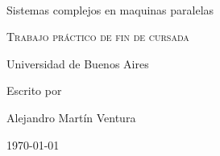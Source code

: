 \documentclass[9pt, a4paper,english,spanish]{amsart}
\begin{document}
\makeatletter
\preto{\@verbatim}{\topsep=0pt \partopsep=0pt }
\makeatother

\begin{center}
~\\ ~\\ ~\\ ~\\ ~\\ ~\\ 
{\LARGE Sistemas complejos en maquinas paralelas}%
\vspace*{1\baselineskip}

\scshape %
Trabajo práctico de fin de cursada

\vspace*{1\baselineskip}
Universidad de Buenos Aires\\[\baselineskip]


\vspace*{5\baselineskip} 

Escrito por \\[\baselineskip]
{\Large Alejandro Martín Ventura\par} 

\vspace*{1\baselineskip}
\today

\end{center}
\newpage

\tableofcontents

\newpage
\twocolumn










\end{document}
